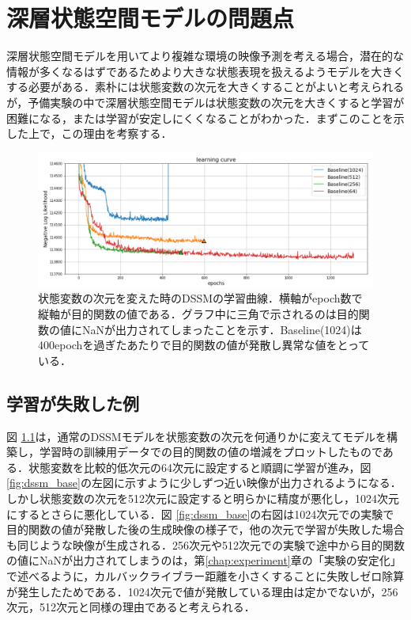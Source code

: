 \chapter{深層状態空間モデルの問題点}
\label{chap:baseline}

深層状態空間モデルを用いてより複雑な環境の映像予測を考える場合，潜在的な情報が多くなるはずであるためより大きな状態表現を扱えるようモデルを大きくする必要がある．素朴には状態変数の次元を大きくすることがよいと考えられるが，予備実験の中で深層状態空間モデルは状態変数の次元を大きくすると学習が困難になる，または学習が安定しにくくなることがわかった．まずこのことを示した上で，この理由を考察する．

\begin{figure}[bp]
  \begin{center}
    \includegraphics[width=\linewidth]{./figures/dssm_curve.png}
    \caption[状態変数の次元を変えた時のDSSMの学習曲線]{状態変数の次元を変えた時のDSSMの学習曲線．横軸がepoch数で縦軸が目的関数の値である．グラフ中に三角で示されるのは目的関数の値にNaNが出力されてしまったことを示す．Baseline(1024)は400epochを過ぎたあたりで目的関数の値が発散し異常な値をとっている．}
    \label{fig:dssm_curve}
  \end{center}
\end{figure}

\section{学習が失敗した例}
図 \ref{fig:dssm_curve}は，通常のDSSMモデルを状態変数の次元を何通りかに変えてモデルを構築し，学習時の訓練用データでの目的関数の値の増減をプロットしたものである．状態変数を比較的低次元の64次元に設定すると順調に学習が進み，図 \ref{fig:dssm_base}の左図に示すように少しずつ近い映像が出力されるようになる．しかし状態変数の次元を512次元に設定すると明らかに精度が悪化し，1024次元にするとさらに悪化している．図 \ref{fig:dssm_base}の右図は1024次元での実験で目的関数の値が発散した後の生成映像の様子で，他の次元で学習が失敗した場合も同じような映像が生成される．256次元や512次元での実験で途中から目的関数の値にNaNが出力されてしまうのは，第\ref{chap:experiment}章の「実験の安定化」で述べるように，カルバックライブラー距離を小さくすることに失敗しゼロ除算が発生したためである．1024次元で値が発散している理由は定かでないが，256次元，512次元と同様の理由であると考えられる．

